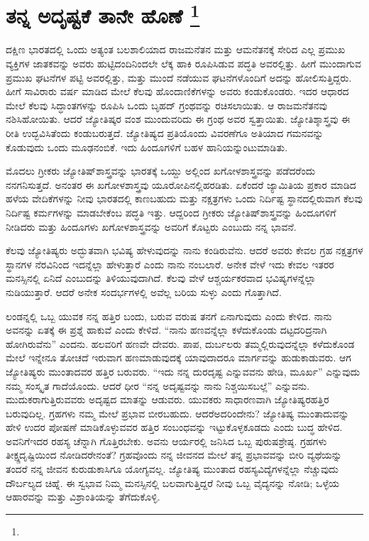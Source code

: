 
\chapter[ತನ್ನ ಅದೃಷ್ಟಕೆ ತಾನೇ ಹೊಣೆ ]{ತನ್ನ ಅದೃಷ್ಟಕೆ ತಾನೇ ಹೊಣೆ \protect\footnote{}}

ದಕ್ಷಿಣ ಭಾರತದಲ್ಲಿ ಒಂದು ಅತ್ಯಂತ ಬಲಶಾಲಿಯಾದ ರಾಜಮನೆತನ ಮತ್ತು ಆ\break ಮನೆತನಕ್ಕೆ ಸೇರಿದ ಎಲ್ಲ ಪ್ರಮುಖ ವ್ಯಕ್ತಿಗಳ ಜಾತಕವನ್ನು ಅವರು ಹುಟ್ಟಿದಂದಿನಿಂದಲೇ ಲೆಕ್ಕ ಹಾಕಿ ರೂಪಿಸಿಡುವ ಪದ್ಧತಿ ಅವರಲ್ಲಿತ್ತು. ಹೀಗೆ ಮುಂದಾಗುವ ಪ್ರಮುಖ ಘಟನೆಗಳ ಪಟ್ಟಿ ಅವರಲ್ಲಿತ್ತು, ಮತ್ತು ಮುಂದೆ ನಡೆಯುವ ಘಟನೆಗಳೊಂದಿಗೆ ಅದನ್ನು ಹೋಲಿಸುತ್ತಿದ್ದರು. ಹೀಗೆ ಸಾವಿರಾರು ವರ್ಷ ಮಾಡಿದ ಮೇಲೆ ಕೆಲವು ಹೊಂದಾಣಿಕೆಗಳನ್ನು ಅವರು ಕಂಡುಕೊಂಡರು. ಇದರ ಆಧಾರದ ಮೇಲೆ ಕೆಲವು ಸಿದ್ಧಾಂತಗಳನ್ನು ರೂಪಿಸಿ ಒಂದು ಬೃಹದ್​ ಗ್ರಂಥವನ್ನು ರಚಿಸಲಾಯಿತು. ಆ ರಾಜಮನೆತನವು ನಶಿಸಿಹೋಯಿತು. ಆದರೆ ಜ್ಯೋತಿಷ್ಕರ ವಂಶ ಮುಂದುವರಿದು ಈ ಗ್ರಂಥ ಅವರ ಸ್ವತ್ತಾಯಿತು. ಜ್ಯೋತಿಶ್ಶಾಸ್ತ್ರವು ಈ ರೀತಿ ಉದ್ಭವಿಸಿತೆಂದು ಕಂಡುಬರುತ್ತದೆ. ಜ್ಯೋತಿಷ್ಯದ ಪ್ರತಿಯೊಂದು ವಿವರಣೆಗೂ ಅತಿಯಾದ ಗಮನವನ್ನು ಕೊಡುವುದು ಒಂದು ಮೂಢನಂಬಿಕೆ. ಇದು ಹಿಂದೂಗಳಿಗೆ ಬಹಳ ಹಾನಿಯನ್ನುಂಟುಮಾಡಿತು.

ಮೊದಲು ಗ್ರೀಕರು ಜ್ಯೋತಿಷ್​ಶಾಸ್ತ್ರವನ್ನು ಭಾರತಕ್ಕೆ ಒಯ್ದು ಅಲ್ಲಿಂದ ಖಗೋಳಶಾಸ್ತ್ರ\-ವನ್ನು ಪಡೆದರೆಂದು ನನಗನಿಸುತ್ತದೆ. ಅನಂತರ ಈ ಖಗೋಳಶಾಸ್ತ್ರವು ಯೂರೋಪಿನಲ್ಲಿ\break ಹರಡಿತು. ಏಕೆಂದರೆ ಜ್ಯಾಮಿತಿಯ ಪ್ರಕಾರ ಮಾಡಿದ ಹಳೆಯ ವೇದಿಕೆಗಳನ್ನು ನೀವು ಭಾರತದಲ್ಲಿ ಕಾಣಬಹುದು ಮತ್ತು ನಕ್ಷತ್ರಗಳು ಒಂದು ನಿರ್ದಿಷ್ಟ ಸ್ಥಾನದಲ್ಲಿರುವಾಗ ಕೆಲವು ನಿರ್ದಿಷ್ಟ ಕರ್ಮಗಳನ್ನು ಮಾಡಬೇಕೆಂಬ ಪದ್ಧತಿ ಇತ್ತು. ಆದ್ದರಿಂದ ಗ್ರೀಕರು ಜ್ಯೋತಿಷ್​ಶಾಸ್ತ್ರವನ್ನು ಹಿಂದೂಗಳಿಗೆ ನೀಡಿದರು ಮತ್ತು ಹಿಂದೂಗಳು ಖಗೋಳಶಾಸ್ತ್ರವನ್ನು ಅವರಿಗೆ ಕೊಟ್ಟರು ಎಂಬುದು ನನ್ನ ಭಾವನೆ.

ಕೆಲವು ಜ್ಯೋತಿಷ್ಯರು ಅದ್ಭುತವಾಗಿ ಭವಿಷ್ಯ ಹೇಳುವುದನ್ನು ನಾನು ಕಂಡಿರುವೆನು. ಆದರೆ ಅವರು ಕೇವಲ ಗ್ರಹ ನಕ್ಷತ್ರಗಳ ಸ್ಥಾನಗಳ ನೆರವಿನಿಂದ ಇದನ್ನೆಲ್ಲಾ ಹೇಳುತ್ತಾರೆ ಎಂದು ನಾನು ನಂಬಲಾರೆ. ಅನೇಕ ವೇಳೆ ಇದು ಕೇವಲ ಇತರರ ಮನಸ್ಸಿನಲ್ಲಿ ಏನಿದೆ ಎಂಬು\-ದನ್ನು ತಿಳಿಯುವುದಾಗಿದೆ. ಕೆಲವು ವೇಳೆ ಆಶ್ಚರ್ಯಕರವಾದ ಭವಿಷ್ಯಗಳನ್ನೆಲ್ಲಾ ನುಡಿಯು\-ತ್ತಾರೆ. ಆದರೆ ಅನೇಕ ಸಂದರ್ಭಗಳಲ್ಲಿ ಅವೆಲ್ಲ ಬರಿಯ ಸುಳ್ಳು ಎಂದು ಗೊತ್ತಾಗಿದೆ.

ಲಂಡನ್ನಲ್ಲಿ ಒಬ್ಬ ಯುವಕ ನನ್ನ ಹತ್ತಿರ ಬಂದು, ಬರುವ ವರುಷ ತನಗೆ ಏನಾಗುವುದು ಎಂದು ಕೇಳಿದ. ನಾನು ಅವನನ್ನು ಏತಕ್ಕೆ ಈ ಪ್ರಶ್ನೆ ಹಾಕುವೆ ಎಂದು ಕೇಳಿದೆ. “ನಾನು ಹಣವನ್ನೆಲ್ಲಾ ಕಳೆದುಕೊಂಡು ದಟ್ಟದರಿದ್ರನಾಗಿ ಹೋಗಿರುವೆನು” ಎಂದನು. ಹಲವರಿಗೆ ಹಣವೇ ದೇವರು. ಪಾಪ, ದುರ್ಬಲರು ತಮ್ಮಲ್ಲಿರುವುದನ್ನೆಲ್ಲಾ ಕಳೆದುಕೊಂಡ ಮೇಲೆ ಇನ್ನೇನೂ ತೋಚದೆ ಇರುವಾಗ ಹಣಮಾಡುವುದಕ್ಕೆ ಯಾವುದಾದರೂ ಮಾರ್ಗವನ್ನು ಹುಡುಕಾಡುವರು. ಆಗ ಜ್ಯೋತಿಷ್ಯರು ಮುಂತಾದವರ ಹತ್ತಿರ ಬರುವರು. “ಇದು ನನ್ನ ದುರದೃಷ್ಟ ಎನ್ನುವವನು ಹೇಡಿ, ಮೂರ್ಖ” ಎನ್ನುವುದು ನಮ್ಮ ಸಂಸ್ಕೃತ ಗಾದೆಯೊಂದು. ಆದರೆ ಧೀರ “ನನ್ನ ಅದೃಷ್ಟವನ್ನು ನಾನು ನಿಶ್ಚಯಿಸಬಲ್ಲೆ” ಎನ್ನುವನು. ಮುದುಕರಾಗುತ್ತಿರು\-ವವರು ಅದೃಷ್ಟದ ಮಾತನ್ನು ಆಡುವರು. ಯುವಕರು ಸಾಧಾರಣವಾಗಿ ಜ್ಯೋತಿಷ್ಯರ\break ಹತ್ತಿರ ಬರುವುದಿಲ್ಲ. ಗ್ರಹಗಳು ನಮ್ಮ ಮೇಲೆ ಪ್ರಭಾವ ಬೀರಬಹುದು. ಆದರೆ\break ಅದರಿಂದೇನು? ಜ್ಯೋತಿಷ್ಯ ಮುಂತಾದುವನ್ನು ಹೇಳಿ ಉದರ ಪೋಷಣೆ ಮಾಡಿಕೊಳ್ಳುವವರ ಹತ್ತಿರ ಸಂಬಂಧವನ್ನು ಇಟ್ಟುಕೊಳ್ಳಕೂಡದು ಎಂದು ಬುದ್ಧ ಹೇಳಿದ. ಅವನಿಗೆ\break ಇದರ ರಹಸ್ಯ ಚೆನ್ನಾಗಿ ಗೊತ್ತಿರಬೇಕು. ಅವನು ಆರ್ಯರಲ್ಲಿ ಜನಿಸಿದ ಒಬ್ಬ ಪುರುಷ\break ಶ್ರೇಷ್ಠ. ಗ್ರಹಗಳು ತೀಕ್ಷ್ಣದೃಷ್ಟಿಯಿಂದ ನೋಡಿದರೇನಂತೆ? ಗ್ರಹವೊಂದು ನನ್ನ ಜೀವನದ ಮೇಲೆ ತನ್ನ ಪ್ರಭಾವವನ್ನು ಬೀರಿ ವ್ಯಥೆಯನ್ನು ತಂದರೆ ನನ್ನ ಜೀವನ ಕುರುಡುಕಾಸಿಗೂ ಯೋಗ್ಯವಲ್ಲ. ಜ್ಯೋತಿಷ್ಯ ಮುಂತಾದ ರಹಸ್ಯವಿದ್ಯೆಗಳನ್ನೆಲ್ಲಾ ನೆಚ್ಚುವುದು ದೌರ್ಬಲ್ಯದ ಚಿಹ್ನೆ. ಈ ಸ್ವಭಾವ ನಿಮ್ಮ ಮನಸ್ಸಿನಲ್ಲಿ ಬಲವಾಗುತ್ತಿದ್ದರೆ ನೀವು ಒಬ್ಬ ವೈದ್ಯನನ್ನು ನೋಡಿ; ಒಳ್ಳೆಯ ಆಹಾರವನ್ನು ಮತ್ತು ವಿಶ್ರಾಂತಿಯನ್ನು ತೆಗೆದುಕೊಳ್ಳಿ.

